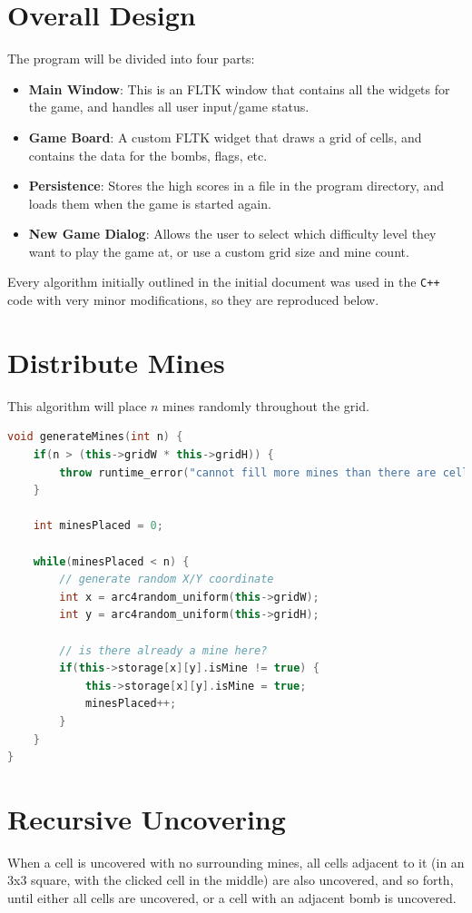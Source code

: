 \documentclass[11pt]{article}
\begin{document}
\section{Overall Design}
The program will be divided into four parts:

\begin{itemize}
	\item \textbf{Main Window}: This is an FLTK window that contains all the widgets for the game, and handles all user input/game status.
	\item \textbf{Game Board}: A custom FLTK widget that draws a grid of cells, and contains the data for the bombs, flags, etc.
	\item \textbf{Persistence}: Stores the high scores in a file in the program directory, and loads them when the game is started again.
	\item \textbf{New Game Dialog}: Allows the user to select which difficulty level they want to play the game at, or use a custom grid size and mine count.
\end{itemize}

Every algorithm initially outlined in the initial document was used in the \texttt{C++} code with very minor modifications, so they are reproduced below.

\section{Distribute Mines}
This algorithm will place $n$ mines randomly throughout the grid.

\begin{lstlisting}[frame=single,language=C++]
void generateMines(int n) {
	if(n > (this->gridW * this->gridH)) {
		throw runtime_error("cannot fill more mines than there are cells");
	}

	int minesPlaced = 0;

	while(minesPlaced < n) {
		// generate random X/Y coordinate
		int x = arc4random_uniform(this->gridW);
		int y = arc4random_uniform(this->gridH);

		// is there already a mine here?
		if(this->storage[x][y].isMine != true) {
			this->storage[x][y].isMine = true;
			minesPlaced++;
		}
	}
}
\end{lstlisting}

\section{Recursive Uncovering}
When a cell is uncovered with no surrounding mines, all cells adjacent to it (in an 3x3 square, with the clicked cell in the middle) are also uncovered, and so forth, until either all cells are uncovered, or a cell with an adjacent bomb is uncovered.
\end{document}

